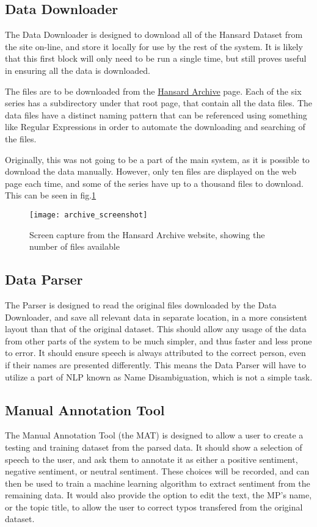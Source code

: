 \subsection{Data Downloader}
The Data Downloader is designed to download all of the Hansard Dataset from the site on-line, and store it locally for use by the rest of the system. It is likely that this first block will only need to be run a single time, but still proves useful in ensuring all the data is downloaded.

The files are to be downloaded from the \href{http://www.hansard-archive.parliament.uk}{Hansard Archive} page. Each of the six series has a subdirectory under that root page, that contain all the data files. The data files have a distinct naming pattern that can be referenced using something like Regular Expressions in order to automate the downloading and searching of the files.

Originally, this was not going to be a part of the main system, as it is possible to download the data manually. However, only ten files are displayed on the web page each time, and some of the series have up to a thousand files to download. This can be seen in fig.\ref{fig:Archive_Screenshot}

\begin{figure}[ht]
	\texttt{[image: archive\_screenshot]}
	\caption{Screen capture from the Hansard Archive website, showing the number of files available}
	\label{fig:Archive_Screenshot}
\end{figure}

\subsection{Data Parser}
The Parser is designed to read the original files downloaded by the Data Downloader, and save all relevant data in separate location, in a more consistent layout than that of the original dataset. This should allow any usage of the data from other parts of the system to be much simpler, and thus faster and less prone to error. It should ensure speech is always attributed to the correct person, even if their names are presented differently. This means the Data Parser will have to utilize a part of NLP known as Name Disambiguation, which is not a simple task. 

\subsection{Manual Annotation Tool}
The Manual Annotation Tool (the MAT) is designed to allow a user to create a testing and training dataset from the parsed data. It should show a selection of speech to the user, and ask them to annotate it as either a positive sentiment, negative sentiment, or neutral sentiment. These choices will be recorded, and can then be used to train a machine learning algorithm to extract sentiment from the remaining data. It would also provide the option to edit the text, the MP's name, or the topic title, to allow the user to correct typos transfered from the original dataset.


